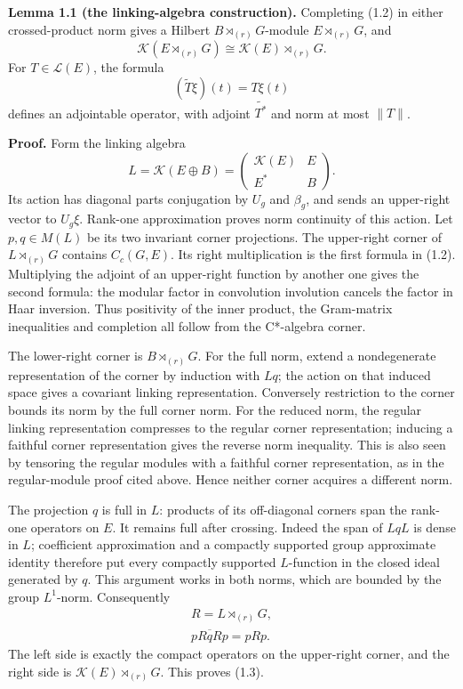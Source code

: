 \documentclass[
  11pt,
]{article}
\begin{document}
\textbf{Lemma 1.1 (the linking-algebra construction).} Completing (1.2)
in either crossed-product norm gives a Hilbert
\(B\rtimes_{(r)}G\)-module \(E\rtimes_{(r)}G\), and \[
\mathcal K(E\rtimes_{(r)}G)
 \cong\mathcal K(E)\rtimes_{(r)}G.
\tag{1.3}
\] For \(T\in\mathcal L(E)\), the formula \[
(\widetilde T\xi)(t)=T\xi(t)
\tag{1.4}
\] defines an adjointable operator, with adjoint \(\widetilde{T^*}\) and
norm at most \(\|T\|\).

\textbf{Proof.} Form the linking algebra \[
L=\mathcal K(E\oplus B)
 =\begin{pmatrix}\mathcal K(E)&E\\E^*&B\end{pmatrix}.
\tag{1.5}
\] Its action has diagonal parts conjugation by \(U_g\) and \(\beta_g\),
and sends an upper-right vector to \(U_g\xi\). Rank-one approximation
proves norm continuity of this action. Let \(p,q\in M(L)\) be its two
invariant corner projections. The upper-right corner of
\(L\rtimes_{(r)}G\) contains \(C_c(G,E)\). Its right multiplication is
the first formula in (1.2). Multiplying the adjoint of an upper-right
function by another one gives the second formula: the modular factor in
convolution involution cancels the factor in Haar inversion. Thus
positivity of the inner product, the Gram-matrix inequalities and
completion all follow from the C*-algebra corner.

The lower-right corner is \(B\rtimes_{(r)}G\). For the full norm, extend
a nondegenerate representation of the corner by induction with \(Lq\);
the action on that induced space gives a covariant linking
representation. Conversely restriction to the corner bounds its norm by
the full corner norm. For the reduced norm, the regular linking
representation compresses to the regular corner representation; inducing
a faithful corner representation gives the reverse norm inequality. This
is also seen by tensoring the regular modules with a faithful corner
representation, as in the regular-module proof cited above. Hence
neither corner acquires a different norm.

The projection \(q\) is full in \(L\): products of its off-diagonal
corners span the rank-one operators on \(E\). It remains full after
crossing. Indeed the span of \(LqL\) is dense in \(L\); coefficient
approximation and a compactly supported group approximate identity
therefore put every compactly supported \(L\)-function in the closed
ideal generated by \(q\). This argument works in both norms, which are
bounded by the group \(L^1\)-norm. Consequently \[
\begin{gathered}
R=L\rtimes_{(r)}G,\\
\overline{pRqRp}=pRp.
\end{gathered}
\tag{1.6}
\] The left side is exactly the compact operators on the upper-right
corner, and the right side is \(\mathcal K(E)\rtimes_{(r)}G\). This
proves (1.3).
\end{document}
